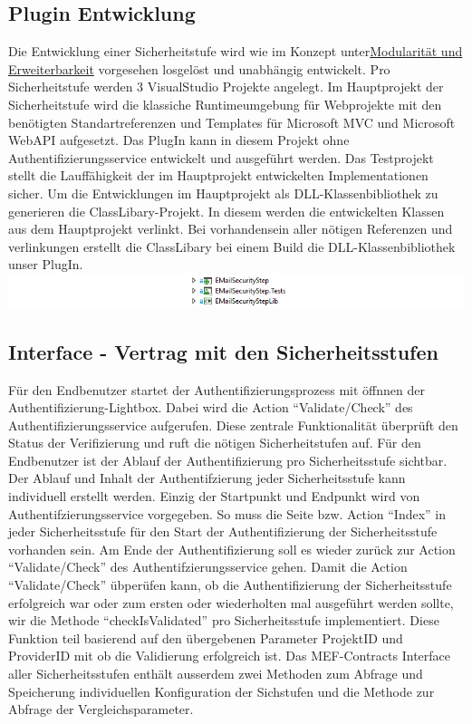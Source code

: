 \subsection{Plugin Entwicklung}\label{plugin-entwicklung}

Die Entwicklung einer Sicherheitstufe wird wie im Konzept
unter\protect\hyperlink{modularituxe4t-und-erweiterbarkeit}{Modularität
und Erweiterbarkeit} vorgesehen losgelöst und unabhängig entwickelt. Pro
Sicherheitstufe werden 3 VisualStudio Projekte angelegt. Im Hauptprojekt
der Sicherheitstufe wird die klassiche Runtimeumgebung für Webprojekte
mit den benötigten Standartreferenzen und Templates für Microsoft MVC
und Microsoft WebAPI aufgesetzt. Das PlugIn kann in diesem Projekt ohne
Authentifizierungsservice entwickelt und ausgeführt werden. Das
Testprojekt stellt die Lauffähigkeit der im Hauptprojekt entwickelten
Implementationen sicher. Um die Entwicklungen im Hauptprojekt als
DLL-Klassenbibliothek zu generieren die ClassLibary-Projekt. In diesem
werden die entwickelten Klassen aus dem Hauptprojekt verlinkt. Bei
vorhandensein aller nötigen Referenzen und verlinkungen erstellt die
ClassLibary bei einem Build die DLL-Klassenbibliothek unser PlugIn.
\includegraphics{images/visualstudio_securitystep.jpg}

\subsection{Interface - Vertrag mit den
Sicherheitsstufen}\label{interface---vertrag-mit-den-sicherheitsstufen}

Für den Endbenutzer startet der Authentifizierungsprozess mit öffnnen
der Authentifizierung-Lightbox. Dabei wird die Action ``Validate/Check''
des Authentifizierungsservice aufgerufen. Diese zentrale Funktionalität
überprüft den Status der Verifizierung und ruft die nötigen
Sicherheitstufen auf. Für den Endbenutzer ist der Ablauf der
Authentifizierung pro Sicherheitsstufe sichtbar. Der Ablauf und Inhalt
der Authentifzierung jeder Sicherheitsstufe kann individuell erstellt
werden. Einzig der Startpunkt und Endpunkt wird von
Authentifzierungsservice vorgegeben. So muss die Seite bzw. Action
``Index'' in jeder Sicherheitsstufe für den Start der Authentifizierung
der Sicherheitsstufe vorhanden sein. Am Ende der Authentifizierung soll
es wieder zurück zur Action ``Validate/Check'' des
Authentifzierungsservice gehen. Damit die Action ``Validate/Check''
übperüfen kann, ob die Authentifizierung der Sicherheitsstufe
erfolgreich war oder zum ersten oder wiederholten mal ausgeführt werden
sollte, wir die Methode ``checkIsValidated'' pro Sicherheitsstufe
implementiert. Diese Funktion teil basierend auf den übergebenen
Parameter ProjektID und ProviderID mit ob die Validierung erfolgreich
ist. Das MEF-Contracts Interface aller Sicherheitsstufen enthält
ausserdem zwei Methoden zum Abfrage und Speicherung individuellen
Konfiguration der Sichstufen und die Methode zur Abfrage der
Vergleichsparameter.

